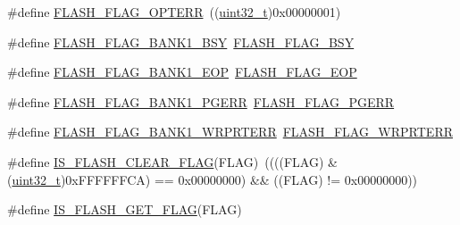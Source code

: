 \begin{DoxyCompactItemize}
\#define \hyperlink{group___f_l_a_s_h___flags_gac36b0605df97c9414933369a32251e4a}{F\+L\+A\+S\+H\+\_\+\+F\+L\+A\+G\+\_\+\+O\+P\+T\+E\+RR}~((\hyperlink{_p_e___types_8h_a33594304e786b158f3fb30289278f5af}{uint32\+\_\+t})0x00000001)
\item 
\#define \hyperlink{group___f_l_a_s_h___flags_ga1f85e6d511503886e9fbe7d0228c97a4}{F\+L\+A\+S\+H\+\_\+\+F\+L\+A\+G\+\_\+\+B\+A\+N\+K1\+\_\+\+B\+SY}~\hyperlink{group___f_l_a_s_h___flags_gad3bc368f954ad7744deda3315da2fff7}{F\+L\+A\+S\+H\+\_\+\+F\+L\+A\+G\+\_\+\+B\+SY}
\item 
\#define \hyperlink{group___f_l_a_s_h___flags_gafa7670ee5ce8a2eb1f64c458a9f08e5b}{F\+L\+A\+S\+H\+\_\+\+F\+L\+A\+G\+\_\+\+B\+A\+N\+K1\+\_\+\+E\+OP}~\hyperlink{group___f_l_a_s_h___flags_gaf043ba4d8f837350bfc7754a99fae5a9}{F\+L\+A\+S\+H\+\_\+\+F\+L\+A\+G\+\_\+\+E\+OP}
\item 
\#define \hyperlink{group___f_l_a_s_h___flags_gaa1056ffdd1c434a2967d5ed7c0d263be}{F\+L\+A\+S\+H\+\_\+\+F\+L\+A\+G\+\_\+\+B\+A\+N\+K1\+\_\+\+P\+G\+E\+RR}~\hyperlink{group___f_l_a_s_h___flags_gae2ef62dee0a5ca01e6226746039b6f20}{F\+L\+A\+S\+H\+\_\+\+F\+L\+A\+G\+\_\+\+P\+G\+E\+RR}
\item 
\#define \hyperlink{group___f_l_a_s_h___flags_ga1646345adbcda773ef25785b1bdc4c43}{F\+L\+A\+S\+H\+\_\+\+F\+L\+A\+G\+\_\+\+B\+A\+N\+K1\+\_\+\+W\+R\+P\+R\+T\+E\+RR}~\hyperlink{group___f_l_a_s_h___flags_ga5c59a7f07507cac38091275964d3d35d}{F\+L\+A\+S\+H\+\_\+\+F\+L\+A\+G\+\_\+\+W\+R\+P\+R\+T\+E\+RR}
\item 
\#define \hyperlink{group___f_l_a_s_h___flags_ga82f8c6104c348d6aa47c7658ed3b6b36}{I\+S\+\_\+\+F\+L\+A\+S\+H\+\_\+\+C\+L\+E\+A\+R\+\_\+\+F\+L\+AG}(F\+L\+AG)~((((F\+L\+AG) \& (\hyperlink{_p_e___types_8h_a33594304e786b158f3fb30289278f5af}{uint32\+\_\+t})0x\+F\+F\+F\+F\+F\+F\+C\+A) == 0x00000000) \&\& ((\+F\+L\+A\+G) != 0x00000000))
\item 
\#define \hyperlink{group___f_l_a_s_h___flags_ga61b60325cd94e1608e34afc7aff20ee4}{I\+S\+\_\+\+F\+L\+A\+S\+H\+\_\+\+G\+E\+T\+\_\+\+F\+L\+AG}(F\+L\+AG)
\end{DoxyCompactItemize}
